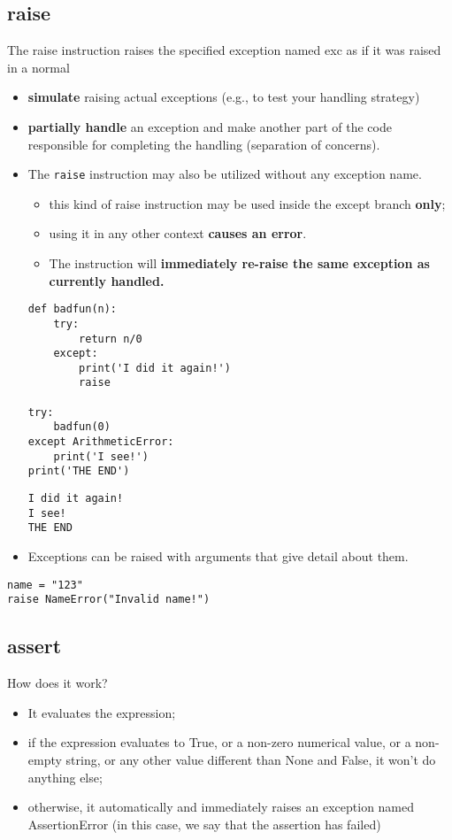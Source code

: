 \documentclass[11pt]{article}
\begin{document}
\subsection{raise}
\label{sec:orgf295769}
The raise instruction raises the specified exception named exc as if
it was raised in a normal
\begin{itemize}
\item \textbf{simulate} raising actual exceptions (e.g., to test your handling
strategy)
\item \textbf{partially handle} an exception and make another part of the code
responsible for completing the handling (separation of concerns).
\item The \texttt{raise} instruction may also be utilized without any exception
name.
\begin{itemize}
\item this kind of raise instruction may be used inside the except
branch \textbf{only};
\item using it in any other context \textbf{causes an error}.
\item The instruction will \textbf{immediately re-raise the same exception as
currently handled.}
\end{itemize}
\begin{verbatim}
def badfun(n):
    try:
        return n/0
    except:
        print('I did it again!')
        raise

try:
    badfun(0)
except ArithmeticError:
    print('I see!')
print('THE END')
\end{verbatim}

\begin{verbatim}
I did it again!
I see!
THE END
\end{verbatim}

\item Exceptions can be raised with arguments that give detail about them.
\end{itemize}

\begin{verbatim}
name = "123"
raise NameError("Invalid name!")
\end{verbatim}

\subsection{assert}
\label{sec:org67ab7c6}
How does it work?
\begin{itemize}
\item It evaluates the expression;
\item if the expression evaluates to True, or a non-zero numerical value,
or a non-empty string, or any other value different than None and
False, it won’t do anything else;
\item otherwise, it automatically and immediately raises an exception
named AssertionError (in this case, we say that the assertion has
failed)
\end{itemize}
\end{document}
